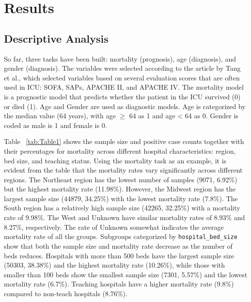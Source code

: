\documentclass[10.7pt,]{article}
\begin{document}
\section{Results}\label{results}
\subsection{Descriptive Analysis}\label{Descriptive Analysis}
So far, three tasks have been built: mortality (prognosis), age (diagnosis), and gender (diagnosis). The variables were selected according to the article by Tang et al.,\cite{11} which selected variables based on several evaluation scores that are often used in ICU: SOFA, SAPs, APACHE II, and APACHE IV. The mortality model is a prognostic model that predicts whether the patient in the ICU survived (0) or died (1). Age and Gender are used as diagnostic models. Age is categorized by the median value (64 years), with age \(\geq\) 64 as 1 and age < 64 as 0. Gender is coded as male is 1 and female is 0.
  
Table ~\ref{tab:Table1} shows the sample size and positive case counts together with their percentages for mortality across different hospital characteristics: region, bed size, and teaching status. Using the mortality task as an example, it is evident from the table that the mortality rates vary significantly across different regions. The Northeast region has the lowest number of samples (9071, 6.92\%) but the highest mortality rate (11.98\%). However, the Midwest region has the largest sample size (44879, 34.25\%) with the lowest mortality rate (7.8\%). The South region has a relatively high sample size (42265, 32.25\%) with a mortality rate of 9.98\%. The West and Unknown have similar mortality rates of 8.93\% and 8.27\%, respectively. The rate of Unknown somewhat indicates the average mortality rate of all the groups. Subgroups categorized by \texttt{hospital\_bed\_size} show that both the sample size and mortality rate decrease as the number of beds reduces. Hospitals with more than 500 beds have the largest sample size (50303, 38.38\%) and the highest mortality rate (10.26\%), while those with smaller than 100 beds show the smallest sample size (7301, 5.57\%) and the lowest mortality rate (6.7\%). Teaching hospitals have a higher mortality rate (9.8\%) compared to non-teach hospitals (8.76\%).
\end{document}
